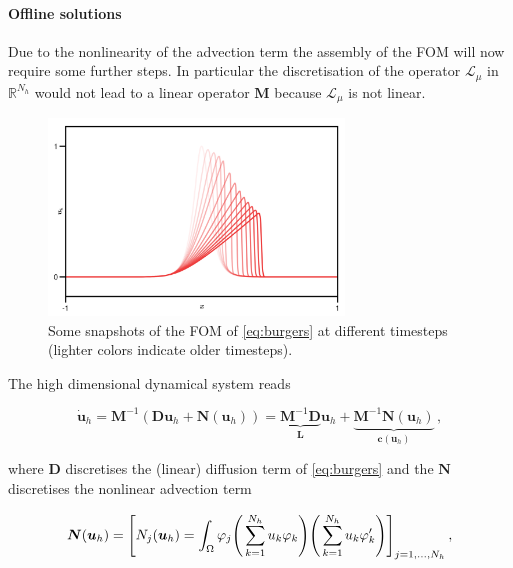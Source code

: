 \documentclass[../main.tex]{subfiles}
\begin{document}
\paragraph{Offline solutions}\label{par:burgers_fom}

Due to the nonlinearity of the advection term the assembly of the FOM will now require some further steps.
In particular the discretisation of the operator $\mathcal{L}_{\mu}$ in $\mathbb{R}^{N_{h}}$ would not lead to a linear operator $\boldsymbol{M}$ because $\mathcal{L}_{\mu}$ is not linear.

\begin{figure}[H]
    \centering 
    \includegraphics[keepaspectratio, width=0.7\textwidth]{../figures/fig:burgers_fom.png}
    \caption{Some snapshots of the FOM of \eqref{eq:burgers} at different timesteps (lighter colors indicate older timesteps).}
    \label{fig:burgers_fom}
\end{figure}

The high dimensional dynamical system reads

\begin{equation*}
        \dot{\boldsymbol{u}}_{h} = \boldsymbol{M}^{-1}(\boldsymbol{D}\boldsymbol{u}_{h} + \boldsymbol{N}(\boldsymbol{u}_{h})) = \underbrace{\boldsymbol{M}^{-1}\boldsymbol{D}}_{\boldsymbol{L}}\boldsymbol{u}_{h} + \underbrace{\boldsymbol{M}^{-1}\boldsymbol{N}(\boldsymbol{u}_{h})}_{\boldsymbol{c}(\boldsymbol{u}_{h})}\,,
\end{equation*}

where $\boldsymbol{D}$ discretises the (linear) diffusion term of \eqref{eq:burgers} and the $\boldsymbol{N}$ discretises the nonlinear advection term

\begin{equation*}
        \boldsymbol{N}(\boldsymbol{u}_{h})=\Bigg[N_{j}(\boldsymbol{u}_{h}) = \int_{\Omega}^{}\varphi_{j}\Bigg(\sum_{k=1}^{N_{h}}u_{k}\varphi_{k}\Bigg)\Bigg(\sum_{k=1}^{N_{h}}u_{k}\varphi'_{k}\Bigg)\Bigg]_{j=1,\dots,N_{h}}\,,
\end{equation*}
\end{document}
